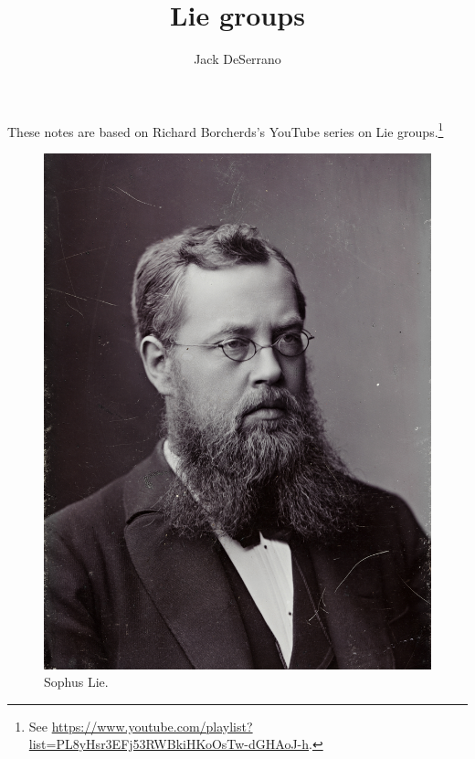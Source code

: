 \documentclass [11 pt, oneside] {article}
\title {Lie groups}
\author {Jack DeSerrano}
\begin{document}
\maketitle

These notes are based on Richard Borcherds's YouTube series on Lie groups.\footnote{See \url{https://www.youtube.com/playlist?list=PL8yHsr3EFj53RWBkiHKoOsTw-dGHAoJ-h}.}

\begin {figure}
	\begin {center}
		\includegraphics [scale = 0.33] {images/lie}
		\caption {Sophus Lie.}
	\end {center}
\end {figure}

\newpage

\end{document}
